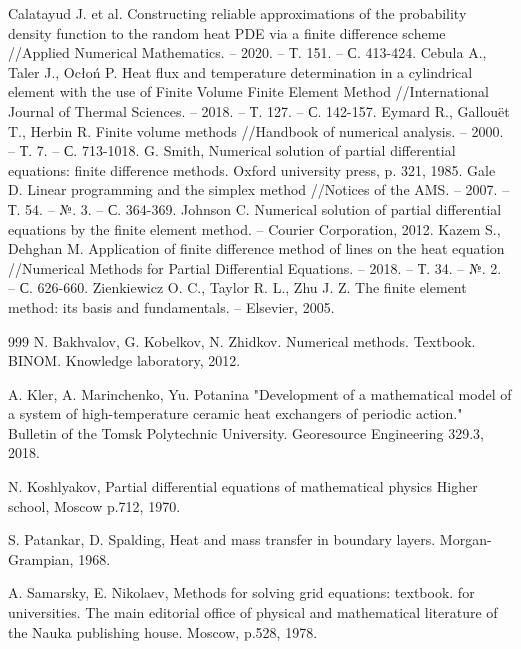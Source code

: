\documentclass[a4paper,11pt,numreferences,mathsec,kaplist]{isuepsutf8}
\begin{document}
\begin{article}
\begin{thebibliography}{999}
 Calatayud J. et al. Constructing reliable
    approximations of the probability density function to the random
    heat PDE via a finite difference scheme //Applied Numerical
    Mathematics. – 2020. – Т. 151. – С. 413-424.
Cebula A., Taler J., Ocłoń P. Heat flux and
    temperature determination in a cylindrical element with the use of
    Finite Volume Finite Element Method //International Journal of
    Thermal Sciences. – 2018. – Т. 127. – С. 142-157.
Eymard R., Gallouët T., Herbin R. Finite volume
    methods //Handbook of numerical analysis. – 2000. – Т. 7. – С.
    713-1018.
 G. Smith, Numerical solution of partial differential
    equations: finite difference methods. Oxford university press, p.
    321, 1985.
 Gale D. Linear programming and the simplex method
    //Notices of the AMS. – 2007. – Т. 54. – №. 3. – С. 364-369.
 Johnson C. Numerical solution of partial differential
    equations by the finite element method. – Courier Corporation,
    2012.
Kazem S., Dehghan M. Application of finite difference
    method of lines on the heat equation //Numerical Methods for
    Partial Differential Equations. – 2018. – Т. 34. – №. 2. – С.
    626-660.
Zienkiewicz O. C., Taylor R. L., Zhu J. Z. The finite
    element method: its basis and fundamentals. – Elsevier, 2005.
\end{thebibliography}

\begin{bibliographyl}{999}
 N. Bakhvalov, G. Kobelkov, N. Zhidkov. Numerical
    methods. Textbook. BINOM. Knowledge laboratory, 2012.

A. Kler, A. Marinchenko, Yu. Potanina "Development of
    a mathematical model of a system of high-temperature ceramic heat
    exchangers of periodic action." Bulletin of the Tomsk Polytechnic
    University. Georesource Engineering 329.3, 2018.

N. Koshlyakov, Partial differential equations of
    mathematical physics Higher school, Moscow p.712, 1970.
    
S. Patankar, D. Spalding, Heat and mass transfer in
    boundary layers. Morgan-Grampian, 1968.

 A. Samarsky, E. Nikolaev, Methods for solving grid
    equations: textbook. for universities. The main editorial office
    of physical and mathematical literature of the Nauka publishing
    house. Moscow, p.528, 1978.


\end{bibliographyl}
\end{article}
\end{document}
